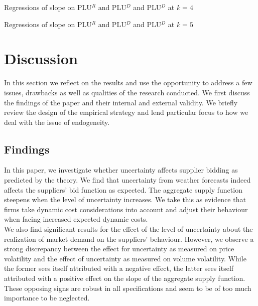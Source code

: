 \begin{table}[!ht]
\vspace{-2.5cm}

\vspace{-0.2cm}
\caption{\label{mainNS1_7} Regressions of slope on PLU$^R$ and PLU$^{D}$ and PLU$^{D}$ at $k=4$}
\vspace{0.9cm}

\vspace{-0.2cm}
\caption{\label{mainNS1_9} Regressions of slope on PLU$^R$ and PLU$^{D}$ and PLU$^{D}$ at $k=5$}
\end{table}

\section{Discussion }
\label{discussgeneral}
\pagestyle{plain}
In this section we reflect on the results and use the opportunity to address a few issues, drawbacks as well as qualities of the research conducted. We first discuss the findings of the paper and their internal and external validity. We briefly review the design of the empirical strategy and lend particular focus to how we deal with the issue of endogeneity.

\subsection{Findings}\label{findings}
In this paper, we investigate whether uncertainty affects supplier bidding as predicted by the theory. We find that uncertainty from weather forecasts indeed affects the suppliers' bid function as expected. The aggregate supply function steepens when the level of uncertainty increases. We take this as evidence that firms take dynamic cost considerations into account and adjust their behaviour when facing increased expected dynamic costs. \\

We also find significant results for the effect of the level of uncertainty about the realization of market demand on the suppliers' behaviour. However, we observe a strong discrepancy between the effect for uncertainty as measured on price volatility and the effect of uncertainty as measured on volume volatility. While the former sees itself attributed with a negative effect, the latter sees itself attributed with a positive effect on the slope of the aggregate supply function. These opposing signs are robust in all specifications and seem to be of too much importance to be neglected. \\

